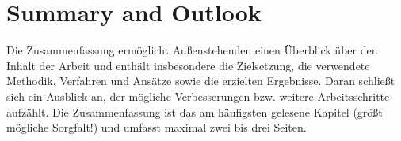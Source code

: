 \chapter{Summary and Outlook}

Die Zusammenfassung ermöglicht Außenstehenden einen Überblick über den Inhalt der Arbeit und enthält insbesondere die Zielsetzung, die verwendete Methodik, Verfahren und Ansätze sowie die erzielten Ergebnisse. Daran schließt sich ein Ausblick an, der mögliche Verbesserungen bzw. weitere Arbeitsschritte aufzählt. Die Zusammenfassung ist das am häufigsten gelesene Kapitel (größt mögliche Sorgfalt!) und umfasst maximal zwei bis drei Seiten.


